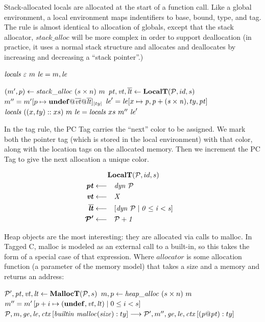 \documentclass{article}
\begin{document}
Stack-allocated locals are allocated at the start of a function call. Like a global environment,
a local environment maps indentifiers to base, bound, type, and tag. The rule is almost identical
to allocation of globals, except that the stack allocator, \(\mathit{stack\_alloc}\) will be more
complex in order to support deallocation (in practice, it uses a normal stack structure and allocates
and deallocates by increasing and decreasing a ``stack pointer''.)

\judgment{}
         {\(\mathit{locals} ~ \varepsilon ~ m ~ \mathit{le} = m,\mathit{le}\)}

                   {\((m',p) \leftarrow \mathit{stack\_alloc} ~ (s \times n) ~ m\)}
                   {\(\mathit{pt},\mathit{vt},\overline{\mathit{lt}} \leftarrow \mathbf{LocalT}(\mathcal{P},id,s)\)}
                   {\(\mem'' = \mem'[p \mapsto \vundef@\overline{\vt}@\overline{\lt}]_{|ty|}\)}
                   {\(\mathit{le}' = \mathit{le}[x \mapsto \mathit{p,p+(s \times n)},ty,\mathit{pt}]\)}
                   {\(\mathit{locals} ~ ((x,ty)::xs) ~ m ~ \mathit{le} = \mathit{locals} ~ xs ~ m'' ~ \mathit{le}'\)}

In the tag rule, the PC Tag carries the ``next'' color to be assigned. We mark both the pointer tag
(which is stored in the local environment) with that color, along with the location tags on the
allocated memory. Then we increment the PC Tag to give the next allocation a unique color.

\[\begin{aligned}
\truledef{\localt{\PCT}{id}{s}}
\settag{\pt}{dyn ~ \PCT}
\settag{\vt}{X}
\settag{\overline{\lt}}{\left[dyn ~ \PCT \mid 0 \leq i < s\right]}
\settag{\PCT'}{\PCT+1}
\end{aligned}\]
         
Heap objects are the most interesting: they are allocated via calls to malloc.
In Tagged C, malloc is modeled as an external call to a built-in, so this takes the form
of a special case of that expression. Where \(\mathit{allocator}\) is some allocation
function (a parameter of the memory model) that takes a size and a memory and returns an address:

              {\(\mathcal{P}',\mathit{pt},\mathit{vt},\mathit{lt} \leftarrow \mathbf{MallocT}(\mathcal{P},s)\)}
              {\(m,p \leftarrow \mathit{heap\_alloc} ~ (s \times n) ~ m\)}
              {\(m'' = m'\left[p + i \mapsto (\mathbf{undef},\mathit{vt},\mathit{lt}) \mid 0 \leq i < s\right]\)}
              {\(\mathcal{P}, m, \mathit{ge}, \mathit{le}, \mathit{ctx}\left[\mathit{builtin} ~ \mathit{malloc}(\mathit{size}) : ty\right]
                \longrightarrow
                \mathcal{P}', m'', \mathit{ge}, \mathit{le}, \mathit{ctx}\left[(\mathit{p} @ \mathit{pt}) : ty\right]\)}
\end{document}
